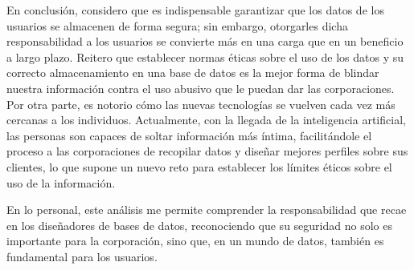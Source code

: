 En conclusión, considero que es indispensable garantizar que los datos de los usuarios se almacenen de forma segura; sin embargo, otorgarles dicha responsabilidad a los usuarios se convierte más en una carga que en un beneficio a largo plazo. Reitero que establecer normas éticas sobre el uso de los datos y su correcto almacenamiento en una base de datos es la mejor forma de blindar nuestra información contra el uso abusivo que le puedan dar las corporaciones. Por otra parte, es notorio cómo las nuevas tecnologías se vuelven cada vez más cercanas a los individuos. Actualmente, con la llegada de la inteligencia artificial, las personas son capaces de soltar información más íntima, facilitándole el proceso a las corporaciones de recopilar datos y diseñar mejores perfiles sobre sus clientes, lo que supone un nuevo reto para establecer los límites éticos sobre el uso de la información.

En lo personal, este análisis me permite comprender la responsabilidad que recae en los diseñadores de bases de datos, reconociendo que su seguridad no solo es importante para la corporación, sino que, en un mundo de datos, también es fundamental para los usuarios.
